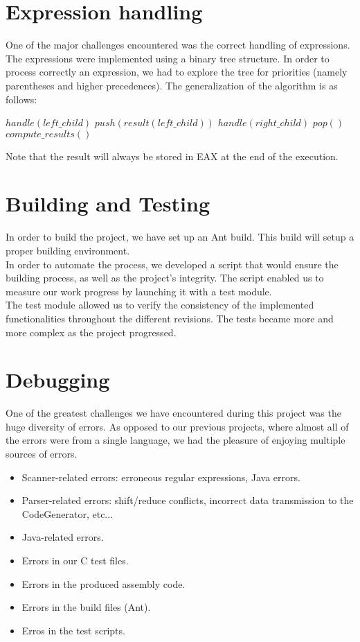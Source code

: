 \documentclass{article}
\begin{document}
\section{Expression handling}
One of the major challenges encountered was the correct handling of expressions.
The expressions were implemented using a binary tree structure. In order to process correctly an expression, we had to explore the tree for priorities (namely parentheses and higher precedences). The generalization of the algorithm is as follows:

\begin{algorithmic}
\State $handle(left\_child)$
\State $push(result(left\_child))$
\State $handle(right\_child)$
\State $pop()$
\State $compute\_results()$
\EndIf
\end{algorithmic}

Note that the result will always be stored in EAX at the end of the execution.

\section{Building and Testing}
In order to build the project, we have set up an Ant build. This build will setup a proper building environment.\\
In order to automate the process, we developed a script that would ensure the building process, as well as the project's integrity. The script enabled us to measure our work progress by launching it with a test module.\\
The test module allowed us to verify the consistency of the implemented functionalities throughout the different revisions. The tests became more and more complex as the project progressed.

\section{Debugging}
One of the greatest challenges we have encountered during this project was the huge diversity of errors. As opposed to our previous projects, where almost all of the errors were from a single language, we had the pleasure of enjoying multiple sources of errors.\\

\begin{itemize}
\item Scanner-related errors: erroneous regular expressions, Java errors.
\item Parser-related errors: shift/reduce conflicts, incorrect data transmission to the CodeGenerator, etc...
\item Java-related errors.
\item Errors in our C test files.
\item Errors in the produced assembly code.
\item Errors in the build files (Ant).
\item Erros in the test scripts.
\end{itemize}
\end{document}

